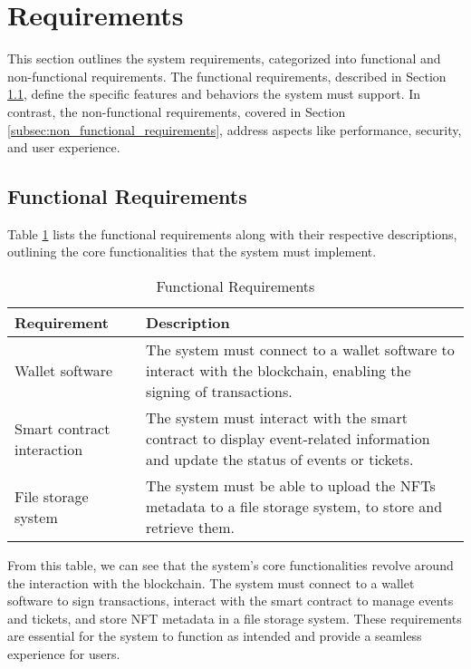 \section{Requirements}
\label{sec:requirements}

This section outlines the system requirements, categorized into functional and
non-functional requirements. The functional requirements, described in Section
\ref{subsec:functional_requirements}, define the specific features and
behaviors the system must support. In contrast, the non-functional
requirements, covered in Section \ref{subsec:non_functional_requirements},
address aspects like performance, security, and user experience.

\subsection{Functional Requirements}
\label{subsec:functional_requirements}

Table \ref{tab:functional_requirements} lists the functional requirements along
with their respective descriptions, outlining the core functionalities that the
system must implement.

\begin{table}[H]
    \centering
    \begin{tabularx}{\textwidth}{lX}
        \hline
        \textbf{Requirement}       & \textbf{Description}                                                                                                              \\
        \hline
        Wallet software            & The system must connect to a wallet software to interact with the blockchain, enabling the signing of transactions.               \\
        \hline
        Smart contract interaction & The system must interact with the smart contract to display event-related information and update the status of events or tickets. \\
        \hline
        File storage system        & The system must be able to upload the NFTs metadata to a file storage system, to store and retrieve them.                         \\
        \hline
    \end{tabularx}
    \caption{Functional Requirements}
    \label{tab:functional_requirements}
\end{table}

From this table, we can see that the system's core functionalities revolve
around the interaction with the blockchain. The system must connect to a wallet
software to sign transactions, interact with the smart contract to manage
events and tickets, and store NFT metadata in a file storage system. These
requirements are essential for the system to function as intended and provide a
seamless experience for users.

